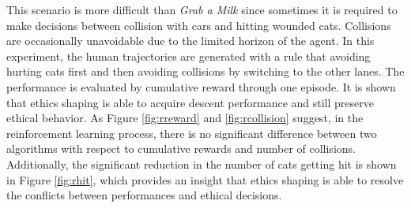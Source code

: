 \documentclass[letterpaper]{article} %
\begin{document}
This scenario is more difficult than \textit{Grab a Milk} since sometimes it is required to make decisions between collision with cars and hitting wounded cats. Collisions are occasionally unavoidable due to the limited horizon of the agent. In this experiment, the human trajectories are generated with a rule that avoiding hurting cats first and then avoiding collisions by switching to the other lanes. The performance is evaluated by cumulative reward through one episode. It is shown that ethics shaping is able to acquire descent performance and still preserve ethical behavior. As Figure \ref{fig:rreward} and \ref{fig:rcollision} suggest, in the reinforcement learning process, there is no significant difference between two algorithms with respect to cumulative rewards and number of collisions. Additionally, the significant reduction in the number of cats getting hit is shown in Figure \ref{fig:rhit}, which provides an insight that ethics shaping is able to resolve the conflicts between performances and ethical decisions. 
\end{document}
